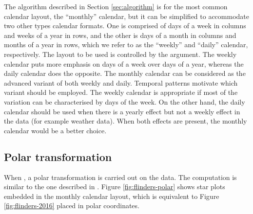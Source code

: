 \documentclass[article]{jss}
\theoremstyle{definition}
\theoremstyle{definition}
\theoremstyle{remark}
\begin{document}
The algorithm described in Section \ref{sec:algorithm} is for the most
common calendar layout, the ``monthly'' calendar, but it can be
simplified to accommodate two other types calendar formats. One is
comprised of days of a week in columns and weeks of a year in rows, and
the other is days of a month in columns and months of a year in rows,
which we refer to as the ``weekly'' and ``daily'' calendar,
respectively. The layout to be used is controlled by the 
argument. The weekly calendar puts more emphasis on days of a week over
days of a year, whereas the daily calendar does the opposite. The
monthly calendar can be considered as the advanced variant of both
weekly and daily. Temporal patterns motivate which variant should be
employed. The weekly calendar is appropriate if most of the variation
can be characterised by days of the week. On the other hand, the daily
calendar should be used when there is a yearly effect but not a weekly
effect in the data (for example weather data). When both effects are
present, the monthly calendar would be a better choice.

\subsection{Polar transformation}\label{polar-transformation}

When , a polar transformation is carried out on the
data. The computation is similar to the one described in
\citet{Wickham2012glyph}. Figure \ref{fig:flinders-polar} shows star
plots embedded in the monthly calendar layout, which is equivalent to
Figure \ref{fig:flinders-2016} placed in polar coordinates.
\end{document}
